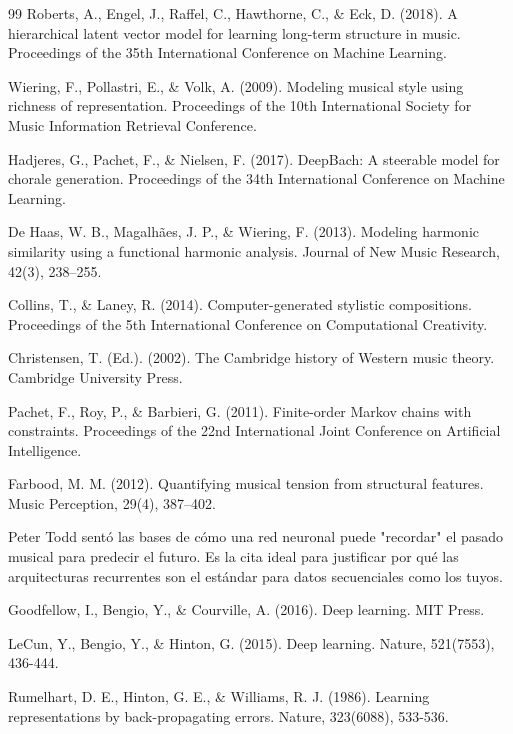 \documentclass[12pt]{report}
\begin{document}
\begin{thebibliography}{99}
\cite{roberts2018hierarchical} Roberts, A., Engel, J., Raffel, C., Hawthorne, C., \& Eck, D. (2018). A hierarchical latent vector model for learning long-term structure in music. Proceedings of the 35th International Conference on Machine Learning.

 Wiering, F., Pollastri, E., \& Volk, A. (2009). Modeling musical style using richness of representation. Proceedings of the 10th International Society for Music Information Retrieval Conference.

 Hadjeres, G., Pachet, F., \& Nielsen, F. (2017). DeepBach: A steerable model for chorale generation. Proceedings of the 34th International Conference on Machine Learning.

 De Haas, W. B., Magalhães, J. P., \& Wiering, F. (2013). Modeling harmonic similarity using a functional harmonic analysis. Journal of New Music Research, 42(3), 238–255.

 Collins, T., \& Laney, R. (2014). Computer-generated stylistic compositions. Proceedings of the 5th International Conference on Computational Creativity.

 Christensen, T. (Ed.). (2002). The Cambridge history of Western music theory. Cambridge University Press.

 Pachet, F., Roy, P., \& Barbieri, G. (2011). Finite-order Markov chains with constraints. Proceedings of the 22nd International Joint Conference on Artificial Intelligence.

 Farbood, M. M. (2012). Quantifying musical tension from structural features. Music Perception, 29(4), 387–402.


 Peter Todd sentó las bases de cómo una red neuronal puede "recordar" el pasado musical para predecir el futuro. Es la cita ideal para justificar por qué las arquitecturas recurrentes son el estándar para datos secuenciales como los tuyos.

 Goodfellow, I., Bengio, Y., \& Courville, A. (2016). Deep learning. MIT Press.

 LeCun, Y., Bengio, Y., \& Hinton, G. (2015). Deep learning. Nature, 521(7553), 436-444.

 Rumelhart, D. E., Hinton, G. E., \& Williams, R. J. (1986). Learning representations by back-propagating errors. Nature, 323(6088), 533-536.


\end{thebibliography}
\end{document}
